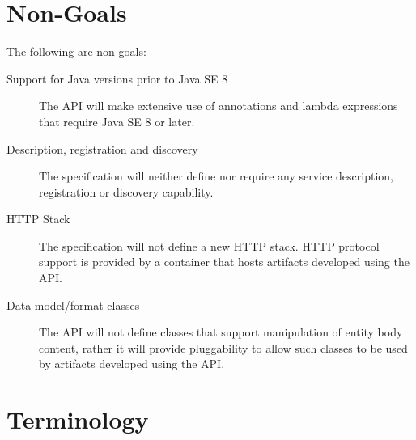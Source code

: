 \section{Non-Goals}
\label{non_goals}

The following are non-goals:

\begin{description}
    \item[Support for Java versions prior to Java SE 8] The API will make extensive use of annotations and lambda
    expressions that require Java SE 8 or later.
    \item[Description, registration and discovery] The specification will neither define nor require any service
    description, registration or discovery capability.
    \item[HTTP Stack] The specification will not define a new HTTP stack. HTTP protocol support is provided by a
    container that hosts artifacts developed using the API.
    \item[Data model/format classes] The API will not define classes that support manipulation of entity body content,
    rather it will provide pluggability to allow such classes to be used by artifacts developed using the API.
\end{description}

\section{Terminology}
\label{terminology}


